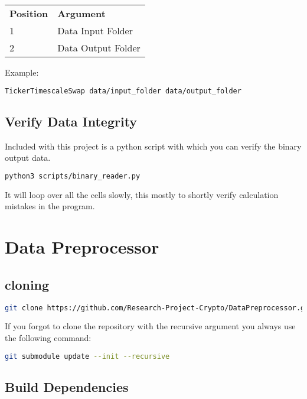 \documentclass[12pt,a4paper]{article}
\begin{document}
\begin{table}[H]
\begin{tabular}{ll}
\textbf{Position} & \textbf{Argument}  \\
1                 & Data Input Folder  \\
2                 & Data Output Folder
\end{tabular}
\end{table}

Example:
\begin{lstlisting}[language=bash]
TickerTimescaleSwap data/input_folder data/output_folder
\end{lstlisting}

\subsection{Verify Data Integrity}

Included with this project is a python script with which you can verify the binary output data.

\begin{lstlisting}[language=bash]
python3 scripts/binary_reader.py
\end{lstlisting}

It will loop over all the cells slowly, this mostly to shortly verify calculation mistakes in the program.

\section{Data Preprocessor}

\subsection{cloning}

\begin{lstlisting}[language=bash]
git clone https://github.com/Research-Project-Crypto/DataPreprocessor.git --recursive
\end{lstlisting}

If you forgot to clone the repository with the recursive argument you always use the following command:

\begin{lstlisting}[language=bash]
git submodule update --init --recursive
\end{lstlisting}

\subsection{Build Dependencies}
\end{document}
